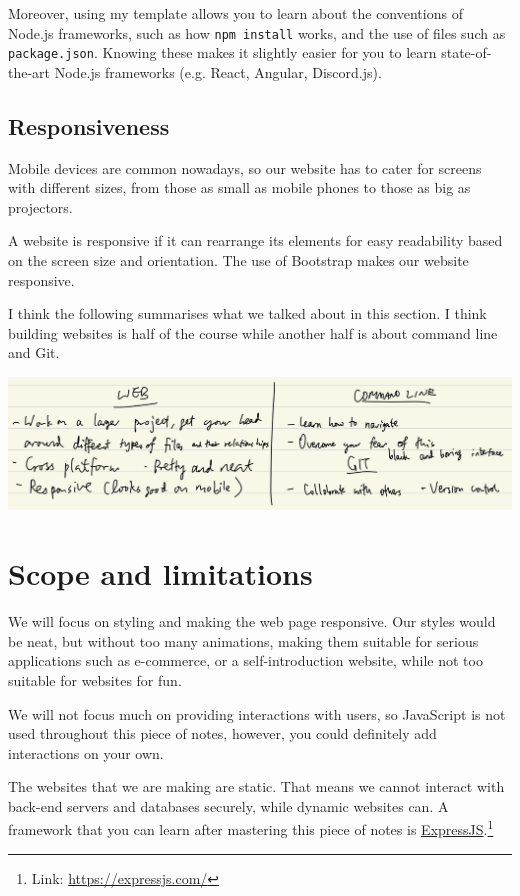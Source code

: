 Moreover, using my template allows you to learn about the conventions of Node.js frameworks, such as how \texttt{npm install} works, and the use of files such as \texttt{package.json}. Knowing these makes it slightly easier for you to learn state-of-the-art Node.js frameworks (e.g. React, Angular, Discord.js).

\subsection*{Responsiveness}

Mobile devices are common nowadays, so our website has to cater for screens with different sizes, from those as small as mobile phones to those as big as projectors. 

A website is responsive if it can rearrange its elements for easy readability based on the screen size and orientation. The use of Bootstrap makes our website responsive.
\vspace{6mm}

I think the following summarises what we talked about in this section. I think building websites is half of the course while another half is about command line and Git.

\includegraphics[width=15cm]{images/ch0-summary-of-course.png}

\section{Scope and limitations}
\label{sec:limitations}
We will focus on styling and making the web page responsive. Our styles would be neat, but without too many animations, making them suitable for serious applications such as e-commerce, or a self-introduction website, while not too suitable for websites for fun.

We will not focus much on providing interactions with users, so JavaScript is not used throughout this piece of notes, however, you could definitely add interactions on your own.

The websites that we are making are static. That means we cannot interact with back-end servers and databases securely, while dynamic websites can. A framework that you can learn after mastering this piece of notes is \href{https://expressjs.com/}{ExpressJS}.\footnote{Link: \url{https://expressjs.com/}}